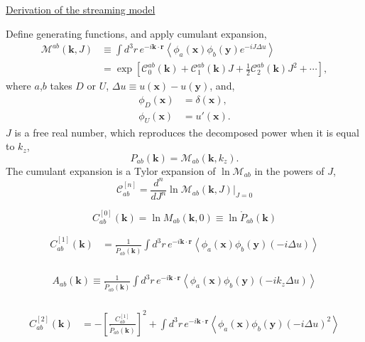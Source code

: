 \documentclass[a4paper,11pt, fleqn]{article}
\begin{document}
\newpage
\underline{Derivation of the streaming model}\vspace{5mm}

Define generating functions, and apply cumulant expansion,
\begin{align}
  \mathcal{M}^{ab}(\bm{k}, J) &\equiv
  \int \!\! d^3 r \, e^{-i\bm{k}\cdot\bm{r}} \left\langle
  \phi_a(\bm{x}) \phi_b(\bm{y}) e^{-iJ\Delta u} \right\rangle\\
  &= \exp\left[
    \mathcal{C}_0^{ab}(\bm{k}) +
    \mathcal{C}_1^{ab}(\bm{k}) J +
    \frac{1}{2} \mathcal{C}_2^{ab}(\bm{k}) J^2 + \cdots
    \right],
\end{align}
where $a$,$b$ takes $D$ or $U$, $\Delta u \equiv u(\bm{x}) - u(\bm{y})$, and,
\begin{align}
  \phi_D(\bm{x}) &= \delta(\bm{x}),\\
  \phi_U(\bm{x}) &= u'(\bm{x}).
\end{align}
$J$ is a free real number, which reproduces the decomposed power when it is equal to $k_z$,
\begin{equation}
  P_{ab}(\bm{k}) = \mathcal{M}_{ab}(\bm{k}, k_z).
\end{equation}
%
The cumulant expansion is a Tylor expansion of $\ln \mathcal{M}_{ab}$ in the powers of $J$,
%
\begin{equation}
  \mathcal{C}_{ab}^{[n]} = \frac{d^n}{dJ^n}
  \ln \mathcal{M}_{ab}(\bm{k}, J) \Big|_{J=0}
\end{equation}

\begin{equation}
  C_{ab}^{[0]}(\bm{k}) =
  \ln M_{ab}(\bm{k}, 0) \equiv \ln \mathring{P}_{ab}(\bm{k})
\end{equation}

\begin{align}
  C_{ab}^{[1]}(\bm{k}) &= \frac{1}{\mathring{P}_{ab}(\bm{k})}
  \int\!d^3 r \, e^{-i\bm{k}\cdot\bm{r}} \left\langle
  \phi_a(\bm{x}) \phi_b(\bm{y}) (-i \Delta u) \right\rangle\\
\end{align}

\begin{align}
  A_{ab}(\bm{k}) \equiv
  \frac{1}{\mathring{P}_{ab}(\bm{k})}
  \int\!d^3 r \, e^{-i\bm{k}\cdot\bm{r}} \left\langle
  \phi_a(\bm{x}) \phi_b(\bm{y}) (-i k_z \Delta u) \right\rangle\\
\end{align}

\begin{align}
  C_{ab}^{[2]}(\bm{k}) &=
  - \left[ \frac{C_{ab}^{[1]}}{\mathring{P}_{ab}(\bm{k})} \right]^2
  + \int\!d^3 r \, e^{-i\bm{k}\cdot\bm{r}} \left\langle
  \phi_a(\bm{x}) \phi_b(\bm{y}) (-i \Delta u)^2 \right\rangle
\end{align}
\end{document}
